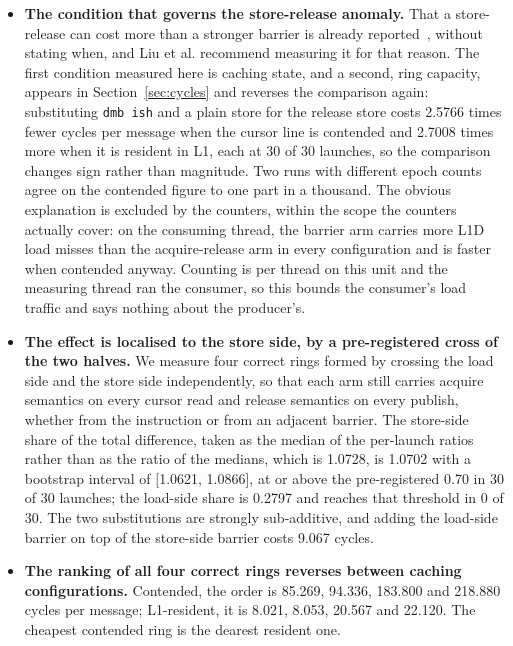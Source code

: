 \documentclass[conference]{IEEEtran}
\begin{document}
\begin{itemize}
\item \textbf{The condition that governs the store-release anomaly.} That a
store-release can cost more than a stronger barrier is already
reported~\cite{liu2020barriers,arden2023riscv}, without stating when, and
Liu et al. recommend measuring it for that reason. The first condition measured
here is caching state, and a second, ring capacity, appears in
Section~\ref{sec:cycles} and reverses the comparison again: substituting \texttt{dmb ish} and a plain store for the release
store costs 2.5766 times fewer cycles per message when the cursor line is
contended and 2.7008 times more when it is resident in L1, each at 30 of 30
launches, so the comparison changes sign rather than magnitude. Two runs with
different epoch counts agree on the contended figure to one part in a thousand.
The obvious explanation is excluded by the counters, within the scope the
counters actually cover: on the consuming thread, the barrier arm carries more
L1D load misses than the acquire-release arm in every configuration and is
faster when contended anyway. Counting is per thread on this unit and the
measuring thread ran the consumer, so this bounds the consumer's load traffic
and says nothing about the producer's.

\item \textbf{The effect is localised to the store side, by a pre-registered
cross of the two halves.} We measure four correct rings formed by crossing the
load side and the store side independently, so that each arm still carries
acquire semantics on every cursor read and release semantics on every publish,
whether from the instruction or from an adjacent barrier. The store-side share
of the total difference, taken as the median of the per-launch ratios rather
than as the ratio of the medians, which is 1.0728, is 1.0702 with a bootstrap
interval of [1.0621, 1.0866], at or above the pre-registered 0.70 in 30 of 30 launches; the
load-side share is 0.2797 and reaches that threshold in 0 of 30. The two
substitutions are strongly sub-additive, and adding the load-side barrier on
top of the store-side barrier costs 9.067 cycles.

\item \textbf{The ranking of all four correct rings reverses between caching
configurations.} Contended, the order is 85.269, 94.336, 183.800 and 218.880
cycles per message; L1-resident, it is 8.021, 8.053, 20.567 and 22.120. The
cheapest contended ring is the dearest resident one.


\end{itemize}
\end{document}
